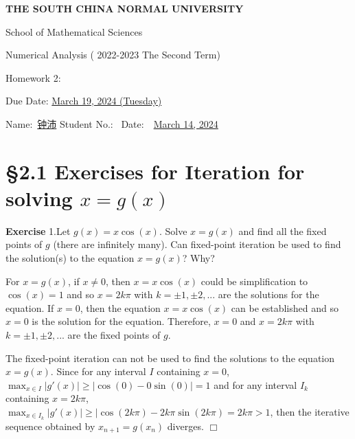 \documentclass[UTF8,12pt,hyperref]{ctexart}
\makeatletter
\newenvironment{exercise}[1][{\color{blue}\bf Exercise}]%
{%
 \begin{center}   \begin{lrbox}{\@tempboxa}%
    \begin{minipage}{\textwidth}%
  {\color{blue}\bfseries
#1}   }{%
    \end{minipage}%
    \end{lrbox}
    \colorbox{green}{\noindent\usebox{\@tempboxa}} \end{center}  
}
\newenvironment{solve}[1][\color{blue}\bf Solve]{\begin{trivlist}
\item[\hskip \labelsep {\color{blue}\bfseries
#1}]}{\hfill$\Box$\end{trivlist}}
\makeatother
\begin{document}

\begin{center}
{\bf  THE SOUTH CHINA NORMAL UNIVERSITY\vspace{0.08cm}

School of Mathematical Sciences\vspace{0.08cm}
 
Numerical Analysis ( 2022-2023 The Second Term) \vspace{0.18cm}

{\Large Homework 2: }\vspace{0.18cm}

Due Date: \underline{March 19, 2024 (Tuesday)} }
\end{center}\vspace{-0.16cm}

\begin{center}
  Name:\ \underline{\qquad 钟沛\hspace{1cm}}\hspace{0.298cm}  
  Student No.:\ \underline{\hspace{1cm}} 
  Date:\ \ \underline{March 14, 2024} 
   \end{center}

 

\section*{\S 2.1 Exercises for Iteration for solving $x=g(x)$}

  
 

  
\begin{exercise}1.\qquad  Let $g(x) = x\cos(x)$. Solve $x = g(x)$ and find all the fixed points of $g$ (there are infinitely many). Can fixed-point iteration be used to find the solution(s) to the equation $x = g(x)$? Why?
 \end{exercise}


 \begin{solve}
	\qquad For $x=g(x)$, if $x\neq 0$, then $x=x\cos(x)$ could be simplification to $\cos(x)=1$
  and so $x=2k\pi$ with $k=\pm 1,\pm 2,...$ are the solutions for the equation.
  If $x=0$, then the equation $x=x\cos(x)$ can be established and so $x=0$ is the solution for the equation. 
  Therefore, $x=0$ and $x=2k\pi$ with $k=\pm 1,\pm 2,...$ are the fixed points of $g$.
  \par
  The fixed-point iteration can not be used to find the solutions to the equation $x=g(x)$.
  Since for any interval $I$ containing $x=0$, $\max_{x\in I} |g'(x)| \geqslant |\cos(0)-0\sin(0)|=1$ and 
  for any interval $I_k$ containing $x=2k\pi$, $\max_{x\in I_k} |g'(x)| \geqslant |\cos(2k\pi) - 2k\pi \sin(2k\pi)=2k\pi>1$, 
  then the iterative sequence obtained by $x_{n+1}=g(x_n)$ diverges.
\end{solve}
\end{document}
